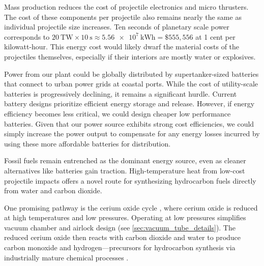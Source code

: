 \documentclass{article}
\begin{document}
Mass production reduces the cost of projectile electronics and micro thrusters. The cost of these components per projectile also remains nearly the same as individual projectile size increases.  Ten seconds of planetary scale power corresponds to $\SI{20}{\tera\watt} \times \SI{10}{\second} \approx \SI{5.56e7}{\kilo\watt\hour} = \$555,556$ at 1 cent per kilowatt-hour.  This energy cost would likely dwarf the material costs of the projectiles themselves, especially if their interiors are mostly water or explosives.      

Power from our plant could be globally distributed by supertanker-sized batteries that connect to urban power grids at coastal ports.  While the cost of utility-scale batteries is progressively declining, it remains a significant hurdle. Current battery designs prioritize efficient energy storage and release. However, if energy efficiency becomes less critical, we could design cheaper low performance batteries. Given that our power source exhibits strong cost efficiencies, we could simply increase the power output to compensate for any energy losses incurred by using these more affordable batteries for distribution. 

Fossil fuels remain entrenched as the dominant energy source, even as cleaner alternatives like batteries gain traction. High-temperature heat from low-cost projectile impacts offers a novel route for synthesizing hydrocarbon fuels directly from water and carbon dioxide.

One promising pathway is the cerium oxide cycle \cite{CeriaThermoCycles}, where cerium oxide is reduced at high temperatures and low pressures. Operating at low pressures simplifies vacuum chamber and airlock design (see \autoref{sec:vacuum_tube_details}). The reduced cerium oxide then reacts with carbon dioxide and water to produce carbon monoxide and hydrogen---precursors for hydrocarbon synthesis via industrially mature chemical processes \cite{water_gas_shift}.
\end{document}
